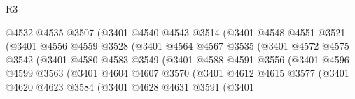 \begin{lexlean}{R3}
\begin{coremodule}
                                @4532
                                @4535
                                @3507
                                (@3401
                                  @4540
                                  @4543
                                  @3514
                                  (@3401
                                    @4548
                                    @4551
                                    @3521
                                    (@3401
                                      @4556
                                      @4559
                                      @3528
                                      (@3401
                                        @4564
                                        @4567
                                        @3535
                                        (@3401
                                          @4572
                                          @4575
                                          @3542
                                          (@3401
                                            @4580
                                            @4583
                                            @3549
                                            (@3401
                                              @4588
                                              @4591
                                              @3556
                                              (@3401
                                                @4596
                                                @4599
                                                @3563
                                                (@3401
                                                  @4604
                                                  @4607
                                                  @3570
                                                  (@3401
                                                    @4612
                                                    @4615
                                                    @3577
                                                    (@3401
                                                      @4620
                                                      @4623
                                                      @3584
                                                      (@3401
                                                        @4628
                                                        @4631
                                                        @3591
                                                        (@3401

\end{coremodule}
\end{lexlean}

